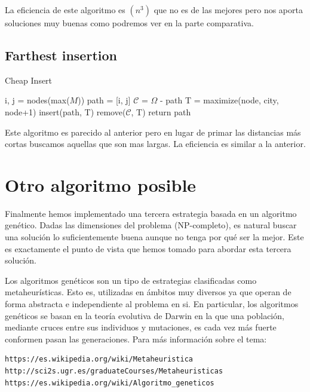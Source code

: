 \documentclass{article}
\begin{document}
La eficiencia de este algoritmo es $(n^3)$ que no es de las mejores
pero nos aporta soluciones muy buenas como podremos ver en la parte
comparativa.

\subsection{Farthest insertion}

\begin{algorithm}[H]
\caption{Cheap Insert}
\begin{algorithmic}
\State i, j = nodes(max($M$))
\State path = [i, j]
\State $\mathcal{C}$ = $\Omega$ - path
\State T = maximize(node, city, node+1)
\EndFor
\State insert(path, T)
\State remove($\mathcal{C}$, T)
\EndIf
\EndFor
\EndWhile
\State return path
\end{algorithmic}
\end{algorithm}

Este algoritmo es parecido al anterior pero en lugar de primar las
distancias más cortas buscamos aquellas que son mas largas. La
eficiencia es similar a la anterior.

\section{Otro algoritmo posible}

Finalmente hemos implementado una tercera estrategia basada en un algoritmo genético. Dadas las dimensiones del problema (NP-completo), es natural buscar una solución lo suficientemente buena aunque no tenga por qué ser la mejor. Este es exactamente el punto de vista que hemos tomado para abordar esta tercera solución.

Los algoritmos genéticos son un tipo de estrategias clasificadas como metaheurísticas. Esto es, utilizadas en ámbitos muy diversos ya que operan de forma abstracta e independiente al problema en si. En particular, los algoritmos genéticos se basan en la teoría evolutiva de Darwin en la que una población, mediante cruces entre sus individuos y mutaciones, es cada vez más fuerte conformen pasan las generaciones. Para más información sobre el tema:

\begin{verbatim}
https://es.wikipedia.org/wiki/Metaheuristica
http://sci2s.ugr.es/graduateCourses/Metaheuristicas
https://es.wikipedia.org/wiki/Algoritmo_geneticos
\end{verbatim}
\end{document}
